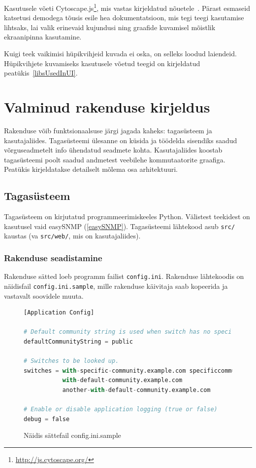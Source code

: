 \documentclass[12pt]{article}
\begin{document}
Kasutusele võeti Cytoscape.js\footnote{\url{http://js.cytoscape.org/}},
mis vastas kirjeldatud nõuetele~\cite{CytoscapeIntro}.
Pärast esmaseid katsetusi demodega tõusis esile hea dokumentatsioon, mis tegi teegi
kasutamise lihtsaks, lai valik erinevaid kujundusi ning graafide kuvamisel mõistlik
ekraanipinna kasutamine.

Kuigi teek vaikimisi hüpikvihjeid kuvada ei oska, on selleks loodud laiendeid.
Hüpikvihjete kuvamiseks kasutusele võetud teegid on kirjeldatud peatükis~\ref{libsUsedInUI}.

\newpage
\section{Valminud rakenduse kirjeldus} \label{description}
Rakenduse võib funktsionaalsuse järgi jagada kaheks: tagasüsteem ja kasutajaliides.
Tagasüsteemi ülesanne on küsida ja töödelda sisendiks saadud võrguseadmetelt info ühendatud
seadmete kohta.
Kasutajaliides koostab tagasüsteemi poolt saadud andmetest veebilehe kommutaatorite graafiga.
Peatükis kirjeldatakse detailselt mõlema osa arhitektuuri.

\subsection{Tagasüsteem}
Tagasüsteem on kirjutatud programmeerimiskeeles Python.
Välistest teekidest on kasutusel vaid easySNMP (\ref{easySNMP}).
Tagasüsteemi lähtekood asub \texttt{src/} kaustas (va \texttt{src/web/}, mis on kasutajaliides).

\subsubsection{Rakenduse seadistamine}
Rakenduse sätted loeb programm failist \texttt{config.ini}.
Rakenduse lähtekoodis on näidisfail \texttt{config.ini.sample}, mille rakenduse käivitaja
saab kopeerida ja vastavalt soovidele muuta.

\begin{figure} [htb]
\begin{lstlisting}[language=Python]
[Application Config]

# Default community string is used when switch has no specific community string set
defaultCommunityString = public

# Switches to be looked up.
switches = with-specific-community.example.com specificcommunity
           with-default-community.example.com
           another-with-default-community.example.com

# Enable or disable application logging (true or false)
debug = false
\end{lstlisting}
\caption{Näidis sättefail config.ini.sample}
\end{figure}
\end{document}
